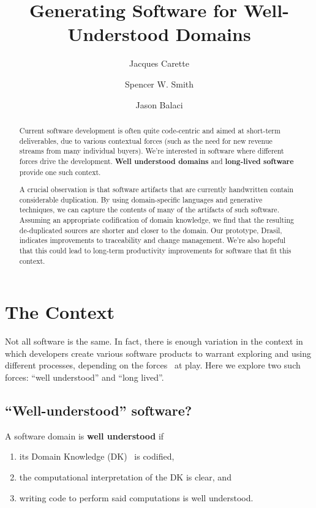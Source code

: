 \documentclass[a4paper,UKenglish,cleveref,autoref,thm-restate]{oasics-v2021}
\title{Generating Software for Well-Understood Domains}
\author{Jacques Carette}{Department of Computing and Software, McMaster University, 1280 Main Street West, Hamilton, Ontario, L8S 4L8, Canada \and \url{https://www.cas.mcmaster.ca/~carette/} }{carette@mcmaster.ca}{https://orcid.org/0000-0001-8993-9804}{}
\author{Spencer W. Smith}{Department of Computing and Software, McMaster University, 1280 Main Street West, Hamilton, Ontario, L8S 4L8, Canada \and \url{https://www.cas.mcmaster.ca/~smiths/} }{smiths@mcmaster.ca}{https://orcid.org/0000-0002-0760-0987}{}
\author{Jason Balaci}{Department of Computing and Software, McMaster University, 1280 Main Street West, Hamilton, Ontario, L8S 4L8, Canada}{balacij@mcmaster.ca}{}{}
\begin{document}
\maketitle

\begin{abstract}
    Current software development is often quite code-centric and aimed at
    short-term deliverables, due to various contextual forces (such as the
    need for new revenue streams from many individual buyers). We're interested
    in software where different forces drive the development. \textbf{Well
    understood domains} and \textbf{long-lived software} provide one such
    context.

    A crucial observation is that software artifacts that are currently
    handwritten contain considerable duplication.  By using domain-specific
    languages and generative techniques, we can capture the contents of many of
    the artifacts of such software.  Assuming an appropriate codification of
    domain knowledge, we find that the resulting de-duplicated sources are
    shorter and closer to the domain.  Our prototype, Drasil, indicates
    improvements to traceability and change management. We're also hopeful
    that this could lead to long-term productivity improvements for software
    that fit this context.
\end{abstract}

\section{The Context}
\label{sec:the-context}

Not all software is the same. In fact, there is enough variation in the
context in which developers create various software products to warrant exploring and
using different processes, depending on the forces~\cite{alexander1977pattern}
at play. Here we explore two such forces: ``well understood'' and ``long
lived''.

\subsection{``Well-understood'' software?}
\label{subsec:well-understood}

\begin{definition}
\label{defn:well-understood}
A software domain is \textbf{well understood} if
\begin{enumerate}
    \item its Domain Knowledge (DK)~\cite{bjorner2021domaineng} is codified,
    \item the computational interpretation of the DK is clear, and
    \item writing code to perform said computations is well understood.
\end{enumerate}
\end{definition}
\end{document}
